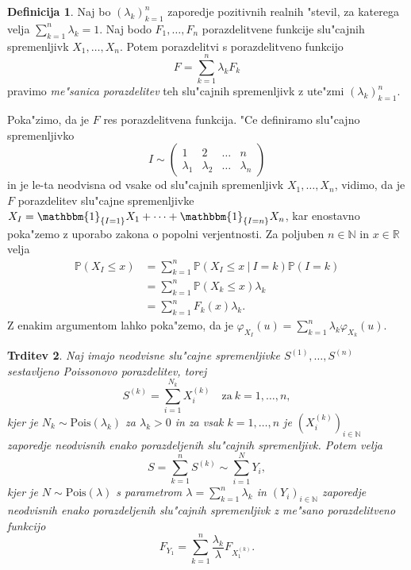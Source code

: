 \documentclass[12pt, a4paper, reqno]{amsart}
\theoremstyle{definition}
\newtheorem{definicija}{Definicija}[section]
\theoremstyle{plain}
\newtheorem{trditev}[definicija]{Trditev}
\newcommand{\R}{\mathbb{R}}
\newcommand{\N}{\mathbb{N}}
\newcommand{\Prob}{\mathbb{P}}
\newcommand{\1}{\mathds{1}}
\newcommand{\Pois}[1]{\text{Pois}(#1)}
\begin{document}
    \begin{definicija}
        Naj bo $(\lambda_k)_{k=1}^n$ zaporedje pozitivnih realnih "stevil, za katerega velja 
        $\sum_{k=1}^n\lambda_k = 1$. Naj bodo $F_1, \dots, F_n$ porazdelitvene funkcije
        slu"cajnih spremenljivk $X_1, \dots, X_n$. Potem porazdelitvi s porazdelitveno 
        funkcijo 
        \begin{equation*}
            F = \sum_{k=1}^n\lambda_kF_k
        \end{equation*}
        pravimo \textit{me"sanica porazdelitev} teh slu"cajnih spremenljivk z ute"zmi $(\lambda_k)_{k=1}^n$.
    \end{definicija}
    \noindent
    Poka"zimo, da je $F$ res porazdelitvena funkcija. "Ce definiramo slu"cajno spremenljivko 
    $$
    I \sim 
    \begin{pmatrix}
        1 & 2  & \dots & n\\
        \lambda_1 & \lambda_2  & \dots & \lambda_n
    \end{pmatrix}
    $$
    in je le-ta neodvisna od vsake od slu"cajnih spremenljivk $X_1, \dots, X_n$, vidimo, da je $F$ 
    porazdelitev slu"cajne spremenljivke $X_I = \mathbbm{1}_{\{I = 1\}}X_1 + \cdots + \mathbbm{1}_{\{I = n\}}X_n$, 
    kar enostavno poka"zemo z uporabo zakona o popolni verjentnosti. Za poljuben $n\in\N$ in $x\in\R$ velja 
    \begin{align*}
        \Prob\left(X_I \leq x\right) 
        &= \sum_{k=1}^n\Prob\left(X_I \leq x \ \big| \ I = k\right)\Prob\left(I = k\right) \\
        &= \sum_{k=1}^n\Prob\left(X_k \leq x\right)\lambda_k \\
        &= \sum_{k=1}^nF_k(x)\lambda_k.
    \end{align*}
    Z enakim argumentom lahko poka"zemo, da je $\varphi_{X_I}(u) = \sum_{k=1}^n\lambda_k\varphi_{X_k}(u)$.


    \begin{trditev}
        Naj imajo neodvisne slu"cajne spremenljivke $S^{(1)}, \dots, S^{(n)}$ sestavljeno Poissonovo porazdelitev, torej 
        \begin{equation*}
            S^{(k)} = \sum_{i=1}^{N_k}X_i^{(k)} \quad \text{za} \ k=1, \dots, n,
        \end{equation*}
        kjer je $N_k\sim \Pois{\lambda_k}$ za $\lambda_k > 0$ in za vsak $k = 1, \dots, n$ je $(X_i^{(k)})_{i\in\N}$ 
        zaporedje neodvisnih enako porazdeljenih slu"cajnih spremenljivk. Potem velja   
        \begin{equation*}
            S = \sum_{k=1}^nS^{(k)} \sim \sum_{i=1}^{N}Y_i,
        \end{equation*}
        kjer je $N\sim\Pois{\lambda}$ s parametrom $\lambda = \sum_{k=1}^n\lambda_k$ in $(Y_i)_{i\in\N}$ zaporedje
        neodvisnih enako porazdeljenih slu"cajnih spremenljivk z me"sano porazdelitveno funkcijo
        \begin{equation*}
        F_{Y_1} = \sum_{k=1}^n\frac{\lambda_k}{\lambda}F_{X_1^{(k)}}.
        \end{equation*}
        \label{trd:vsotaCPDjeCPD}
    \end{trditev}
\end{document}
